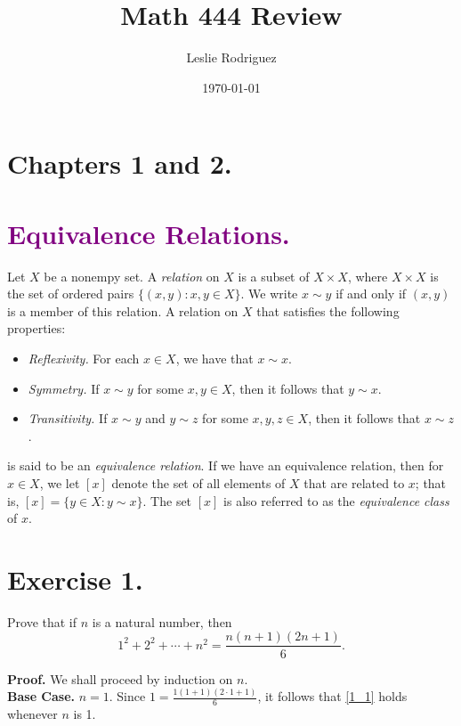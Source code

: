 \documentclass[9pt]{article}
\title{Math 444 Review}
\author{Leslie Rodriguez}
\date{\today}
\newcommand{\D}{\displaystyle}
\begin{document}
   \maketitle

   \section*{Chapters 1 and 2.}

   \section*{\textcolor{purple}{Equivalence Relations.}} Let $X$ be a nonempy 
   set. A \textit{relation} on $X$ is a subset of $X \times X$, where
   $X \times X$ is the set of ordered pairs $\{(x, y) : x, y \in X\}$. We write 
   $x \sim y$ if and only if $(x, y)$ is a member of this relation. A relation
   on $X$ that satisfies the following properties:
   \begin{itemize}
      \item \textit{Reflexivity.} For each $x \in X$, we have that $x \sim x$.
      \item \textit{Symmetry.} If $x \sim y$ for some $x, y \in X$, then it
            follows that $y \sim x$.
      \item \textit{Transitivity.} If $x \sim y$ and $y \sim z$ for some
            $x, y, z \in X$, then it follows that $x \sim z$.
   \end{itemize}
   is said to be an \textit{equivalence relation}. If we have an equivalence
   relation, then for $x \in X$, we let $[x]$ denote the set of all elements of
   $X$ that are related to $x$; that is, $[x] = \{y \in X: y \sim x\}$. The set
   $[x]$ is also referred to as the \textit{equivalence class} of $x$.

   \section*{Exercise 1.} Prove that if $n$ is a natural number, then
   \begin{equation}
      1^2 + 2^2 + \cdots + n^2 = \D\frac{n(n+1)(2n+1)}{6}. \label{1_1}
   \end{equation}

   \textbf{Proof.} We shall proceed by induction on $n$. \\

   \textbf{Base Case.} $n = 1$. Since $1 = \D\frac{1(1 + 1)(2\cdot1+1)}{6}$, it 
   follows that \eqref{1_1} holds whenever $n$ is 1. \\
\end{document}

